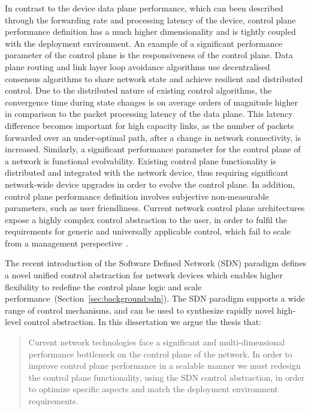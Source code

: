 In contrast to the device data plane performance, which can been described
through the forwarding rate and processing latency of the device, control plane
performance definition has a much higher dimensionality and is tightly coupled
with the deployment environment. An example of a significant performance
parameter of the control plane is the responsiveness of the control plane. Data
plane routing and link layer loop avoidance algorithms use decentralised
consensus algorithms to share network state and achieve resilient and
distributed control.  Due to the distributed nature of existing control
algorithms, the convergence time during state changes is on average orders of
magnitude higher in comparison to the packet processing latency of the data
plane. This latency difference becomes important for high capacity links, as
the number of packets forwarded over an under-optimal path, after a change in
network connectivity, is increased.  Similarly, a significant performance parameter
for the control plane of a network is functional evolvability.  Existing control
plane functionality is distributed and integrated with the network device, thus
requiring significant network-wide device upgrades in order to evolve the
control plane.  In addition, control plane performance definition involves
subjective non-measurable parameters, such as user friendliness.  Current
network control plane architectures expose a highly complex control abstraction
to the user, in order to fulfil the requirements for generic and universally
applicable control, which fail to scale from a management
perspective~\cite{Mahajan02}.

The recent introduction of the Software Defined Network (SDN) paradigm defines a
novel unified control abstraction for network devices which enables higher
flexibility to redefine the control plane logic and scale
performance~(Section~\ref{sec:background:sdn}).  The SDN paradigm supports a
wide range of control mechanisms, and can be used to synthesize rapidly novel
high-level control abstraction.  In this dissertation we argue the thesis that: 

\begin{quotation} 
  Current network technologies face a significant and multi-dimensional
  performance bottleneck on the control plane of the network. In order to
  improve control plane performance in a scalable manner we must redesign the
  control plane functionality, using the SDN control abstraction, in order to
  optimize specific aspects and match the deployment environment requirements. 
\end{quotation}

